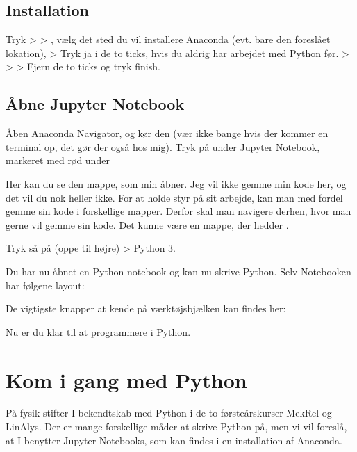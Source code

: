 \documentclass[letterpaper,10pt,english]{jupyterBook}
\begin{document}
\section{Installation}
\label{\detokenize{notebooks/Download_guide_anaconda/Download_anaconda_jupyter:installation}}
Tryk  >  > , vælg det sted du vil installere Anaconda (evt. bare den foreslået lokation), > Tryk ja i de to ticks, hvis du aldrig har arbejdet med Python før.  >  >  > Fjern de to ticks og tryk finish.


\section{Åbne Jupyter Notebook}
\label{\detokenize{notebooks/Download_guide_anaconda/Download_anaconda_jupyter:abne-jupyter-notebook}}
Åben Anaconda Navigator, og kør den (vær ikke bange hvis der kommer en terminal op, det gør der også hos mig). Tryk på  under Jupyter Notebook, markeret med rød under

 Her kan du se den mappe, som min åbner. Jeg vil ikke gemme min kode her, og det vil du nok heller ikke. For at holde styr på sit arbejde, kan man med fordel gemme sin kode i forskellige mapper. Derfor skal man navigere derhen, hvor man gerne vil gemme sin kode. Det kunne være en mappe, der hedder .


Tryk så på  (oppe til højre) > Python 3.

Du har nu åbnet en Python notebook og kan nu skrive Python. Selv Notebooken har følgene layout:


De vigtigste knapper at kende på værktøjsbjælken kan findes her:


Nu er du klar til at programmere i Python.


\chapter{Kom i gang med Python}
\label{\detokenize{notebooks/Basal_python:kom-i-gang-med-python}}\label{\detokenize{notebooks/Basal_python::doc}}
På fysik stifter I bekendtskab med Python i de to førsteårskurser MekRel og LinAlys. Der er mange forskellige måder at skrive Python på, men vi vil foreslå, at I benytter Jupyter Notebooks, som kan findes i en installation af Anaconda.
\end{document}
